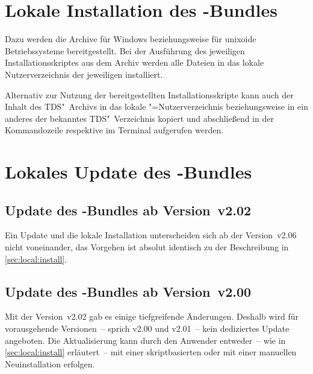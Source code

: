 \section{%
  Lokale Installation des \TUDScript-Bundles%
  \label{sec:local:install}%
}
%

Dazu werden die Archive  
für Windows beziehungsweise  
für unixoide Betriebssysteme bereitgestellt. Bei der Ausführung des jeweiligen 
Installationsskriptes aus dem Archiv werden alle Dateien in das lokale 
Nutzerverzeichnis der jeweiligen \DistributionGeneral installiert. 

Alternativ zur Nutzung der bereitgestellten Installationsskripte kann auch der 
Inhalt des TDS"~Archivs  in das lokale 
"=Nutzerverzeichnis beziehungsweise in ein anderes der 
\DistributionGeneral bekanntes TDS"~Verzeichnis kopiert und abschließend in der 
Kommandozeile respektive im Terminal  aufgerufen werden. 



\section{%
  Lokales Update des \TUDScript-Bundles%
  \label{sec:local:update}%
}
\subsection{Update des \TUDScript-Bundles ab Version~v2.02}
%
Ein Update und die lokale Installation unterscheiden sich ab der Version~v2.06 
nicht voneinander, das Vorgehen ist absolut identisch zu der Beschreibung in 
\autoref{sec:local:install}.



\subsection{Update des \TUDScript-Bundles ab Version~v2.00}
%
Mit der Version~v2.02 gab es einige tiefgreifende Änderungen. Deshalb wird für 
vorausgehende Versionen~-- sprich v2.00 und v2.01~-- kein dediziertes Update 
angeboten. Die Aktualisierung kann durch den Anwender entweder~-- wie in 
\autoref{sec:local:install} erläutert~-- mit einer skriptbasierten oder mit 
einer manuellen Neuinstallation erfolgen.%
%




